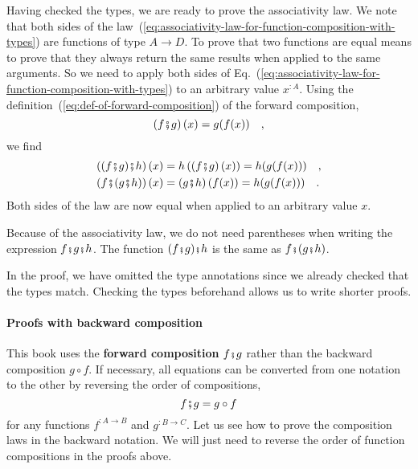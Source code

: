 Having checked the types, we are ready to prove the associativity
law. We note that both sides of the law~(\ref{eq:associativity-law-for-function-composition-with-types})
are functions of type $A\rightarrow D$. To prove that two functions
are equal means to prove that they always return the same results
when applied to the same arguments. So we need to apply both sides
of Eq.~(\ref{eq:associativity-law-for-function-composition-with-types})
to an arbitrary value $x^{:A}$. Using the definition~(\ref{eq:def-of-forward-composition})
of the forward composition, 
\[
\left(f\bef g\right)(x)=g(f(x))\quad,
\]
we find
\begin{align*}
\left((f\bef g)\bef h\right)(x) & =h\left(\left(f\bef g\right)(x)\right)=h(g(f(x)))\quad,\\
\left(f\bef(g\bef h)\right)(x) & =\left(g\bef h\right)(f(x))=h(g(f(x)))\quad.
\end{align*}
Both sides of the law are now equal when applied to an arbitrary value
$x$.

Because of the associativity law, we do not need parentheses when
writing the expression $f\bef g\bef h$. The function $(f\bef g)\bef h$
is the same as $f\bef(g\bef h)$.

In the proof, we have omitted the type annotations since we already
checked that the types match. Checking the types beforehand allows
us to write shorter proofs.

\paragraph{Proofs with backward composition}

This book uses the \textbf{forward composition}
$f\bef g$ rather than the backward composition
$g\circ f$. If necessary, all equations can be converted from one
notation to the other by reversing the order of compositions,
\[
f\bef g=g\circ f
\]
for any functions $f^{:A\rightarrow B}$ and $g^{:B\rightarrow C}$.
Let us see how to prove the composition laws in the backward notation.
We will just need to reverse the order of function compositions in
the proofs above.

